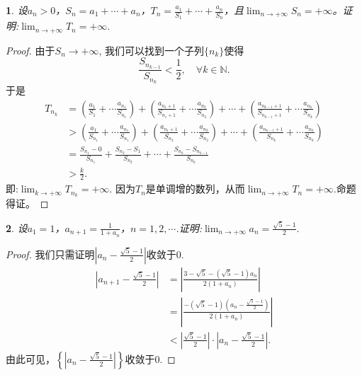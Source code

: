 \documentclass[utf8]{book}
\newtheorem{example}{}[section]             %
\begin{document}
\begin{example}
设$a_n > 0$，$S_n=a_1+\cdots+a_n$，$T_n=\displaystyle\frac{a_1}{S_1}+\cdots+\frac{a_n}{S_n}$，且$\displaystyle  \lim_{n\to +\infty}S_n=+\infty$。证明:$\displaystyle  \lim_{n\to +\infty}T_n=+\infty.$
\end{example}
\begin{proof}
由于$S_n \rightarrow  +\infty$, 我们可以找到一个子列$\{n_k\}$使得
$$\frac{S_{n_{k-1}}}{S_{n_k}} < \frac{1}{2}, \quad\forall k\in\mathbb{N}.$$于是
\begin{equation*}
\begin{split}
T_{n_k} &= \left(\frac{a_1}{S_1}+\cdots \frac{a_{n_1}}{S_{n_1}}\right) + \left(\frac{a_{n_1+1}}{S_{n_1+1}}+\cdots \frac{a_{n_2}}{S_{n_2}}\right) +\cdots+\left(\frac{a_{n_{k-1}+1}}{S_{n_{k-1}+1}}+\cdots \frac{a_{n_k}}{S_{n_k}}\right) \\
&> \left(\frac{a_1}{S_{n_1}}+\cdots \frac{a_{n_1}}{S_{n_1}}\right) + \left(\frac{a_{n_1+1}}{S_{n_2}}+\cdots \frac{a_{n_2}}{S_{n_2}}\right) +\cdots+\left(\frac{a_{n_{k-1}+1}}{S_{n_k}}+\cdots \frac{a_{n_k}}{S_{n_k}}\right)\\
&=\frac{S_{n_1}- 0}{S_{n_1}} + \frac{S_{n_2}-S_1}{S_{n_2}} + \cdots +  \frac{S_{n_k}-S_{n_{k-1}}}{S_{n_{k}}}\\
&>\frac{k}{2}.
\end{split}
\end{equation*}
即:$\displaystyle \lim_{k\to +\infty}T_{n_k}=+\infty.$
因为$T_n$是单调增的数列，从而$\displaystyle \lim_{n\to +\infty}T_{n}=+\infty.$命题 得证。
\end{proof}
\begin{example}
设$a_1=1$，$a_{n+1}=\displaystyle\frac{1}{1+a_n}$，$n=1,2,\cdots$.证明:$\displaystyle  \lim_{n\to +\infty}a_n=\frac{\sqrt{5}-1}{2}.$
\end{example}
\begin{proof}我们只需证明$\left|a_n -\frac{\sqrt{5}-1}{2}\right|$收敛于$0$.
\begin{equation*}
\begin{split}
\left|a_{n+1} - \frac{\sqrt{5}-1}{2}\right| &= \left|\frac{3-\sqrt{5} - (\sqrt{5}-1)a_n}{2(1+a_n)}\right|\\
&=\left|\frac{-(\sqrt{5}-1)\left(a_n-\displaystyle\frac{\sqrt{5}-1}{2}\right)}{2(1+a_n)}\right|\\
&<\left|\frac{\sqrt{5}-1}{2}\right|\cdot\left|a_n-\frac{\sqrt{5}-1}{2}\right|.
\end{split}
\end{equation*}
由此可见，$\left\{\left|a_n-\frac{\sqrt{5}-1}{2}\right|\right\}$收敛于$0$.
\end{proof}
\end{document}
